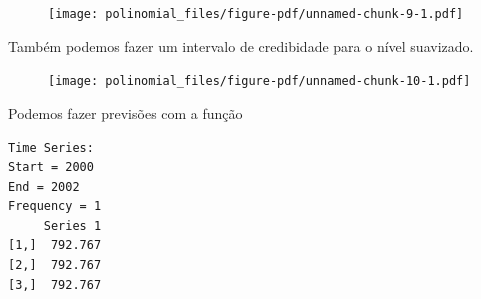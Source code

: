 \documentclass[
  letterpaper,
  DIV=11,
  numbers=noendperiod]{scrreprt}
\newenvironment{Shaded}{\begin{snugshade}}{\end{snugshade}}
\newcommand{\AttributeTok}[1]{\textcolor[rgb]{0.40,0.45,0.13}{#1}}
\newcommand{\CommentTok}[1]{\textcolor[rgb]{0.37,0.37,0.37}{#1}}
\newcommand{\DecValTok}[1]{\textcolor[rgb]{0.68,0.00,0.00}{#1}}
\newcommand{\FloatTok}[1]{\textcolor[rgb]{0.68,0.00,0.00}{#1}}
\newcommand{\FunctionTok}[1]{\textcolor[rgb]{0.28,0.35,0.67}{#1}}
\newcommand{\NormalTok}[1]{\textcolor[rgb]{0.00,0.23,0.31}{#1}}
\newcommand{\OtherTok}[1]{\textcolor[rgb]{0.00,0.23,0.31}{#1}}
\newcommand{\SpecialCharTok}[1]{\textcolor[rgb]{0.37,0.37,0.37}{#1}}
\newcommand{\StringTok}[1]{\textcolor[rgb]{0.13,0.47,0.30}{#1}}
\begin{document}
\begin{figure}[H]

{\centering \texttt{[image: polinomial\_files/figure-pdf/unnamed-chunk-9-1.pdf]}

}

\end{figure}

Também podemos fazer um intervalo de credibidade para o nível suavizado.

\begin{Shaded}
\end{Shaded}

\begin{figure}[H]

{\centering \texttt{[image: polinomial\_files/figure-pdf/unnamed-chunk-10-1.pdf]}

}

\end{figure}

Podemos fazer previsões com a função

\begin{Shaded}
\end{Shaded}

\begin{verbatim}
Time Series:
Start = 2000 
End = 2002 
Frequency = 1 
     Series 1
[1,]  792.767
[2,]  792.767
[3,]  792.767
\end{verbatim}
\end{document}
